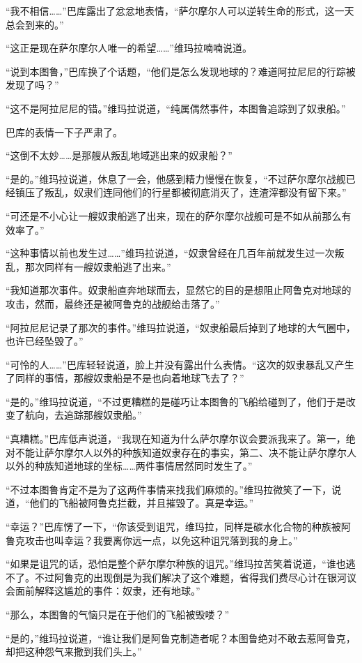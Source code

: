 “我不相信……”巴库露出了忿忿地表情，“萨尔摩尔人可以逆转生命的形式，这一天总会到来的。”

“这正是现在萨尔摩尔人唯一的希望……”维玛拉喃喃说道。

“说到本图鲁，”巴库换了个话题，“他们是怎么发现地球的？难道阿拉尼尼的行踪被发现了吗？”

“这不是阿拉尼尼的错。”维玛拉说道，“纯属偶然事件，本图鲁追踪到了奴隶船。”

巴库的表情一下子严肃了。

“这倒不太妙……是那艘从叛乱地域逃出来的奴隶船？”

“是的。”维玛拉说道，休息了一会，他感到精力慢慢在恢复，“不过萨尔摩尔战舰已经镇压了叛乱，奴隶们连同他们的行星都被彻底消灭了，连渣滓都没有留下来。”

“可还是不小心让一艘奴隶船逃了出来，现在的萨尔摩尔战舰可是不如从前那么有效率了。”

“这种事情以前也发生过……”维玛拉说道，“奴隶曾经在几百年前就发生过一次叛乱，那次同样有一艘奴隶船逃了出来。”

“我知道那次事件。奴隶船直奔地球而去，显然它的目的是想阻止阿鲁克对地球的攻击，然而，最终还是被阿鲁克的战舰给击落了。”

“阿拉尼尼记录了那次的事件。”维玛拉说道，“奴隶船最后掉到了地球的大气圈中，也许已经坠毁了。”

“可怜的人……”巴库轻轻说道，脸上并没有露出什么表情。“这次的奴隶暴乱又产生了同样的事情，那艘奴隶船是不是也向着地球飞去了？”

“是的。”维玛拉说道，“不过更糟糕的是碰巧让本图鲁的飞船给碰到了，他们于是改变了航向，去追踪那艘奴隶船。”

“真糟糕。”巴库低声说道，“我现在知道为什么萨尔摩尔议会要派我来了。第一，绝对不能让萨尔摩尔人以外的种族知道奴隶存在的事实，第二、决不能让萨尔摩尔人以外的种族知道地球的坐标……两件事情居然同时发生了。”

“不过本图鲁肯定不是为了这两件事情来找我们麻烦的。”维玛拉微笑了一下，说道，“他们的飞船被阿鲁克拦截，并且摧毁了。真是幸运。”

“幸运？”巴库愣了一下，“你该受到诅咒，维玛拉，同样是碳水化合物的种族被阿鲁克攻击也叫幸运？我要离你远一点，以免这种诅咒落到我的身上。”

“如果是诅咒的话，恐怕是整个萨尔摩尔种族的诅咒。”维玛拉苦笑着说道，“谁也逃不了。不过阿鲁克的出现倒是为我们解决了这个难题，省得我们费尽心计在银河议会面前解释这尴尬的事件：奴隶，还有地球。”

“那么，本图鲁的气恼只是在于他们的飞船被毁喽？”

“是的，”维玛拉说道，“谁让我们是阿鲁克制造者呢？本图鲁绝对不敢去惹阿鲁克，却把这种怨气来撒到我们头上。”

